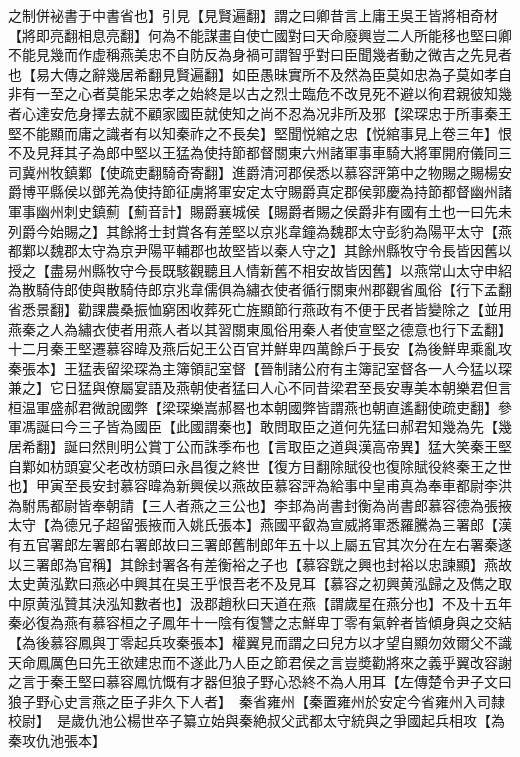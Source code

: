 之制併袐書于中書省也】引見【見賢遍翻】謂之曰卿昔言上庸王吳王皆將相奇材【將即亮翻相息亮翻】何為不能謀畫自使亡國對曰天命廢興豈二人所能移也堅曰卿不能見幾而作虚稱燕美忠不自防反為身禍可謂智乎對曰臣聞幾者動之微吉之先見者也【易大傳之辭幾居希翻見賢遍翻】如臣愚昧實所不及然為臣莫如忠為子莫如孝自非有一至之心者莫能呆忠孝之始終是以古之烈士臨危不改見死不避以徇君親彼知幾者心達安危身擇去就不顧家國臣就使知之尚不忍為况非所及邪【梁琛忠于所事秦王堅不能顯而庸之識者有以知秦祚之不長矣】堅聞悦綰之忠【悦綰事見上卷三年】恨不及見拜其子為郎中堅以王猛為使持節都督關東六州諸軍事車騎大將軍開府儀同三司冀州牧鎮鄴【使疏吏翻騎奇寄翻】進爵清河郡侯悉以慕容評第中之物賜之賜楊安爵博平縣侯以鄧羌為使持節征虜將軍安定太守賜爵真定郡侯郭慶為持節都督幽州諸軍事幽州刺史鎮薊【薊音計】賜爵襄城侯【賜爵者賜之侯爵非有國有土也一曰先未列爵今始賜之】其餘將士封賞各有差堅以京兆韋鐘為魏郡太守彭豹為陽平太守【燕都鄴以魏郡太守為京尹陽平輔郡也故堅皆以秦人守之】其餘州縣牧守令長皆因舊以授之【盡易州縣牧守今長既駭觀聽且人情新舊不相安故皆因舊】以燕常山太守申紹為散騎侍郎使與散騎侍郎京兆韋儒俱為繡衣使者循行關東州郡觀省風俗【行下孟翻省悉景翻】勸課農桑振恤窮困收葬死亡旌顯節行燕政有不便于民者皆變除之【並用燕秦之人為繡衣使者用燕人者以其習關東風俗用秦人者使宣堅之德意也行下孟翻】十二月秦王堅遷慕容暐及燕后妃王公百官并鮮卑四萬餘戶于長安【為後鮮卑乘亂攻秦張本】王猛表留梁琛為主簿領記室督【晉制諸公府有主簿記室督各一人今猛以琛兼之】它日猛與僚屬宴語及燕朝使者猛曰人心不同昔梁君至長安專美本朝樂君但言桓温軍盛郝君微說國弊【梁琛樂嵩郝晷也本朝國弊皆謂燕也朝直遙翻使疏吏翻】參軍馮誕曰今三子皆為國臣【此國謂秦也】敢問取臣之道何先猛曰郝君知幾為先【幾居希翻】誕曰然則明公賞丁公而誅季布也【言取臣之道與漢高帝異】猛大笑秦王堅自鄴如枋頭宴父老改枋頭曰永昌復之終世【復方目翻除賦役也復除賦役終秦王之世也】甲寅至長安封慕容暐為新興侯以燕故臣慕容評為給事中皇甫真為奉車都尉李洪為駙馬都尉皆奉朝請【三人者燕之三公也】李邽為尚書封衡為尚書郎慕容德為張掖太守【為德兄子超留張掖而入姚氏張本】燕國平叡為宣威將軍悉羅騰為三署郎【漢有五官署郎左署郎右署郎故曰三署郎舊制郎年五十以上屬五官其次分在左右署秦遂以三署郎為官稱】其餘封署各有差衡裕之子也【慕容皝之興也封裕以忠諫顯】燕故太史黄泓歎曰燕必中興其在吳王乎恨吾老不及見耳【慕容之初興黄泓歸之及儁之取中原黄泓贊其決泓知數者也】汲郡趙秋曰天道在燕【謂歲星在燕分也】不及十五年秦必復為燕有慕容桓之子鳳年十一陰有復讐之志鮮卑丁零有氣幹者皆傾身與之交結【為後慕容鳳與丁零起兵攻秦張本】權翼見而謂之曰兒方以才望自顯勿效爾父不識天命鳳厲色曰先王欲建忠而不遂此乃人臣之節君侯之言豈奬勸將來之義乎翼改容謝之言于秦王堅曰慕容鳳忼慨有才器但狼子野心恐終不為人用耳【左傳楚令尹子文曰狼子野心史言燕之臣子非久下人者】　秦省雍州【秦置雍州於安定今省雍州入司隸校尉】　是歲仇池公楊世卒子纂立始與秦絶叔父武都太守統與之爭國起兵相攻【為秦攻仇池張本】

